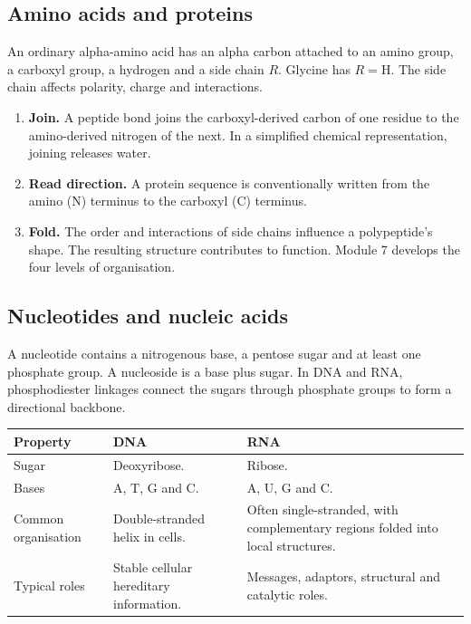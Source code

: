 \documentclass[12pt,a4paper]{article}
\begin{document}
\subsection{Amino acids and proteins}
An ordinary alpha-amino acid has an alpha carbon attached to an amino group, a carboxyl group, a hydrogen and a side chain $R$. Glycine has $R=\mathrm H$. The side chain affects polarity, charge and interactions.
\begin{enumerate}[leftmargin=*, itemsep=3pt, topsep=4pt]
  \item \textbf{Join.} A peptide bond joins the carboxyl-derived carbon of one residue to the amino-derived nitrogen of the next. In a simplified chemical representation, joining releases water.
  \item \textbf{Read direction.} A protein sequence is conventionally written from the amino (N) terminus to the carboxyl (C) terminus.
  \item \textbf{Fold.} The order and interactions of side chains influence a polypeptide's shape. The resulting structure contributes to function. Module 7 develops the four levels of organisation.
\end{enumerate}
\subsection{Nucleotides and nucleic acids}
\begin{tcolorbox}[defbox, title={Nucleotide}]
A nucleotide contains a nitrogenous base, a pentose sugar and at least one phosphate group. A nucleoside is a base plus sugar. In DNA and RNA, phosphodiester linkages connect the sugars through phosphate groups to form a directional backbone.
\end{tcolorbox}

\par\vspace{5pt}
\begingroup
\setlength{\extrarowheight}{1pt}
\noindent\begin{tabularx}{\linewidth}{|B{3.1cm}|Y|Y|}
\hline
\textbf{Property} & \textbf{DNA} & \textbf{RNA} \\ \hline
Sugar & Deoxyribose. & Ribose. \\ \hline
Bases & A, T, G and C. & A, U, G and C. \\ \hline
Common organisation & Double-stranded helix in cells. & Often single-stranded, with complementary regions folded into local structures. \\ \hline
Typical roles & Stable cellular hereditary information. & Messages, adaptors, structural and catalytic roles. \\ \hline
\end{tabularx}\par
\endgroup
\end{document}
